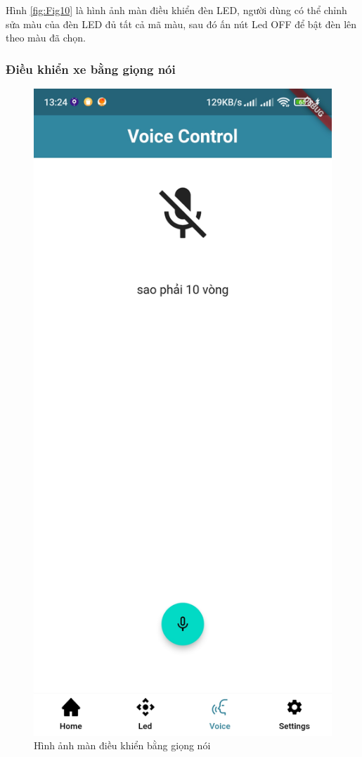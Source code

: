 \documentclass[../DoAn.tex]{subfiles}
\begin{document}
Hình \ref{fig:Fig10} là hình ảnh màn điều khiển đèn LED, người dùng có thể chỉnh sửa màu của đèn LED đủ tất cả mã màu, sau đó ấn nút Led OFF để bật đèn lên theo màu đã chọn.

\subsubsection{Điều khiển xe bằng giọng nói}

\begin{figure}[H]
    \centering
    \includegraphics[scale = 0.2]{Hinhve/app_3.jpg}
    \caption{Hình ảnh màn điều khiển bằng giọng nói}
    \label{fig:Fig11}
\end{figure}
\end{document}
